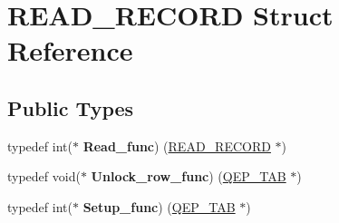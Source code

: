\hypertarget{structREAD__RECORD}{}\section{R\+E\+A\+D\+\_\+\+R\+E\+C\+O\+RD Struct Reference}
\label{structREAD__RECORD}
\subsection*{Public Types}
\begin{DoxyCompactItemize}
\item 
\mbox{\label{structREAD__RECORD_a647a111a19c61165d5ce68d77b6bb8b8}} 
typedef int($\ast$ {\bfseries Read\+\_\+func}) (\mbox{\hyperlink{structREAD__RECORD}{R\+E\+A\+D\+\_\+\+R\+E\+C\+O\+RD}} $\ast$)
\item 
\mbox{\label{structREAD__RECORD_adc7d3c35a57e704666d1bc57623f8b85}} 
typedef void($\ast$ {\bfseries Unlock\+\_\+row\+\_\+func}) (\mbox{\hyperlink{classQEP__TAB}{Q\+E\+P\+\_\+\+T\+AB}} $\ast$)
\item 
\mbox{\label{structREAD__RECORD_aa84fe2f92d6dadced874718d6e1df88f}} 
typedef int($\ast$ {\bfseries Setup\+\_\+func}) (\mbox{\hyperlink{classQEP__TAB}{Q\+E\+P\+\_\+\+T\+AB}} $\ast$)
\end{DoxyCompactItemize}
